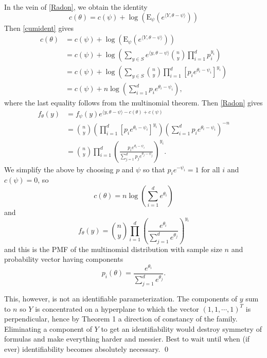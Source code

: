 \documentclass[12pt]{article}
\newcommand{\inner}[1]{\langle #1 \rangle}
\begin{document}
In the vein of \eqref{Radon}, we obtain the identity
\begin{equation} \label{cumident}
	c(\theta) = c(\psi) + \log\left(\mathrm{E}_{\psi}\left(e^{\inner{Y, \theta - \psi}}\right)\right)
\end{equation}
Then \eqref{cumident} gives
\begin{align*}
  c(\theta) &= c(\psi) + \log\left(\mathrm{E}_{\psi}\left(e^{\inner{Y, \theta - \psi}}\right)\right) \\
  &= c(\psi) + \log\left(\sum_{y\in S} e^{\inner{y, \theta - \psi}}{n \choose y} \prod_{i=1}^d p_i^{y_i}\right) \\
  &= c(\psi) + \log\left(\sum_{y\in S} {n \choose y} \prod_{i=1}^d \left[p_ie^{\theta_i - \psi_i}\right]^{y_i}\right) \\  
  &= c(\psi) + n\log\left(\sum_{i=1}^d p_ie^{\theta_i - \psi_i}\right),
\end{align*}
where the last equality follows from the multinomial theorem. Then \eqref{Radon} gives
\begin{align*}
  f_{\theta}(y) &= f_{\psi}(y)e^{\inner{y,\theta-\psi} - c(\theta) + c(\psi)} \\
    &= {n \choose y} \left(\prod_{i=1}^d\left[p_ie^{\theta_i-\psi_i}\right]^{y_i}\right)\left(\sum_{i=1}^d p_ie^{\theta_i-\psi_i}\right)^{-n} \\
    &= {n \choose y} \prod_{i=1}^d \left(\frac{p_ie^{\theta_i-\psi_i}}{\sum_{j=1}^dp_je^{\theta_j-\psi_j}}\right)^{y_i}.
\end{align*}
We simplify the above by choosing $p$ and $\psi$ so that $p_ie^{-\psi_i} = 1$ for all $i$ and $c(\psi) = 0$, so
$$
  c(\theta) = n\log\left(\sum_{i=1}^d e^{\theta_i}\right)
$$
and
$$
  f_{\theta}(y) = {n \choose y}\prod_{i=1}^d \left(\frac{e^{\theta_i}}{\sum_{j=1}^d e^{\theta_j}}\right)^{y_i}
$$
and this is the PMF of the multinomial distribution with sample size $n$ and probability vector having components
$$
  p_i(\theta) = \frac{e^{\theta_i}}{\sum_{j=1}^d e^{\theta_j}}.
$$

This, however, is not an identifiable parameterization. The components of $y$ sum to $n$ so $Y$ is concentrated on a hyperplane to which the vector $(1,1, \cdots, 1)^T$ is perpendicular, hence by Theorem 1 a direction of constancy of the family. Eliminating a component of $Y$ to get an identifiability would destroy symmetry of formulas and make everything harder and messier. Best to wait until when (if ever) identifiability becomes absolutely necessary. \qed
\end{document}
